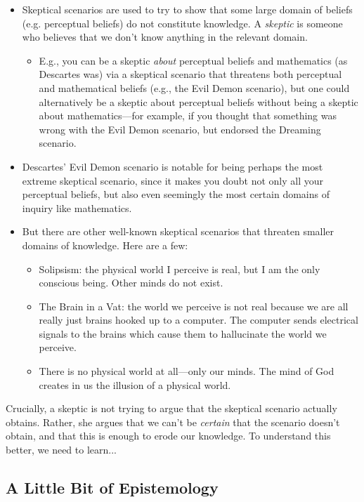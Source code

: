 \documentclass[english, a4paper]{article}
\begin{document}
\begin{itemize}
	\item Skeptical scenarios are used to try to show that some large domain of beliefs (e.g. perceptual beliefs) do not constitute knowledge. A \textit{skeptic} is someone who believes that we don't know anything in the relevant domain.
	\begin{itemize}
		\item E.g., you can be a skeptic \textit{about} perceptual beliefs and mathematics (as Descartes was) via a skeptical scenario that threatens both perceptual and mathematical beliefs (e.g., the Evil Demon scenario), but one could alternatively be a skeptic about perceptual beliefs without being a skeptic about mathematics---for example, if you thought that something was wrong with the Evil Demon scenario, but endorsed the Dreaming scenario. 
	\end{itemize}
	\item Descartes' Evil Demon scenario is notable for being perhaps the most extreme skeptical scenario, since it makes you doubt not only all your perceptual beliefs, but also even seemingly the most certain domains of inquiry like mathematics.
	\item But there are other well-known skeptical scenarios that threaten smaller domains of knowledge. Here are a few:
	\begin{itemize}
		\item Solipsism: the physical world I perceive is real, but I am the only conscious being. Other minds do not exist.
		\item The Brain in a Vat: the world we perceive is not real because we are all really just brains hooked up to a computer. The computer sends electrical signals to the brains which cause them to hallucinate the world we perceive.
		\item There is no physical world at all---only our minds. The mind of God creates in us the illusion of a physical world.
	\end{itemize}
\end{itemize}

Crucially, a skeptic is not trying to argue that the skeptical scenario actually obtains. Rather, she argues that we can't be \textit{certain} that the scenario doesn't obtain, and that this is enough to erode our knowledge. To understand this better, we need to learn...

\subsection*{A Little Bit of Epistemology}
\end{document}
